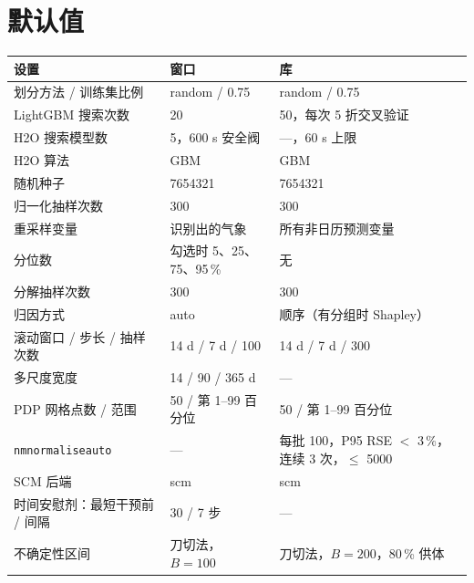 \documentclass[11pt]{ctexrep}
\newcommand{\codeunderscore}{\textunderscore\allowbreak}
\newcommand{\code}[1]{\texttt{\let\_\codeunderscore #1}}
\begin{document}
\chapter{默认值}\label{app:defaults}
\begin{center}\small
\begin{longtable}{@{}p{4.9cm}p{4.3cm}p{5.8cm}@{}}
\toprule
设置 & 窗口 & 库 \\
\midrule
\endhead
划分方法 / 训练集比例          & random / 0.75 & random / 0.75 \\
LightGBM 搜索次数              & 20 & 50，每次 5 折交叉验证 \\
H2O 搜索模型数                 & 5，600 s 安全阀 & ---，60 s 上限 \\
H2O 算法                       & GBM & GBM \\
随机种子                       & 7654321 & 7654321 \\
归一化抽样次数                 & 300 & 300 \\
重采样变量                     & 识别出的气象 & 所有非日历预测变量 \\
分位数                         & 勾选时 5、25、75、95\,\% & 无 \\
分解抽样次数                   & 300 & 300 \\
归因方式                       & auto & 顺序（有分组时 Shapley） \\
滚动窗口 / 步长 / 抽样次数     & 14 d / 7 d / 100 & 14 d / 7 d / 300 \\
多尺度宽度                     & 14 / 90 / 365 d & --- \\
PDP 网格点数 / 范围            & 50 / 第 1--99 百分位 & 50 / 第 1--99 百分位 \\
\code{nm\_normalise\_auto}       & --- & 每批 100，P95 RSE $<$ 3\,\%，连续 3 次，$\le$ 5000 \\
SCM 后端                       & scm & scm \\
时间安慰剂：最短干预前 / 间隔  & 30 / 7 步 & --- \\
不确定性区间                   & 刀切法，$B = 100$ & 刀切法，$B = 200$，80\,\% 供体 \\
\bottomrule
\end{longtable}
\end{center}
\end{document}
